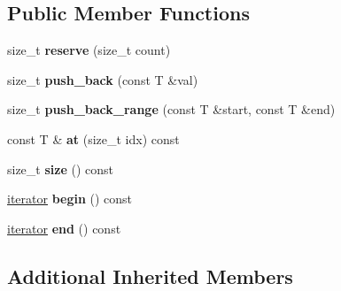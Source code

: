 \subsection*{Public Member Functions}
\begin{DoxyCompactItemize}
\item 
\mbox{\label{classdialog_1_1monolog_1_1monolog__exp2__linear_a460ce1e9eb9b3211965b71234e32b6b6}} 
size\+\_\+t {\bfseries reserve} (size\+\_\+t count)
\item 
\mbox{\label{classdialog_1_1monolog_1_1monolog__exp2__linear_ae9a341fbf7643bc21da4b4cefc73fd85}} 
size\+\_\+t {\bfseries push\+\_\+back} (const T \&val)
\item 
\mbox{\label{classdialog_1_1monolog_1_1monolog__exp2__linear_a48919dd298c662a0568a3661a4ab6f43}} 
size\+\_\+t {\bfseries push\+\_\+back\+\_\+range} (const T \&start, const T \&end)
\item 
\mbox{\label{classdialog_1_1monolog_1_1monolog__exp2__linear_ac947d45a45c5b53f579d11607e9e1983}} 
const T \& {\bfseries at} (size\+\_\+t idx) const
\item 
\mbox{\label{classdialog_1_1monolog_1_1monolog__exp2__linear_a79afc1146fd5f4103f7f2e7c5335c46c}} 
size\+\_\+t {\bfseries size} () const
\item 
\mbox{\label{classdialog_1_1monolog_1_1monolog__exp2__linear_a6a78122f3c49c057f9cd4087ec781489}} 
\hyperlink{classdialog_1_1monolog_1_1monolog__iterator}{iterator} {\bfseries begin} () const
\item 
\mbox{\label{classdialog_1_1monolog_1_1monolog__exp2__linear_a1231b24008d59334d0fb609690a55bb2}} 
\hyperlink{classdialog_1_1monolog_1_1monolog__iterator}{iterator} {\bfseries end} () const
\end{DoxyCompactItemize}
\subsection*{Additional Inherited Members}


